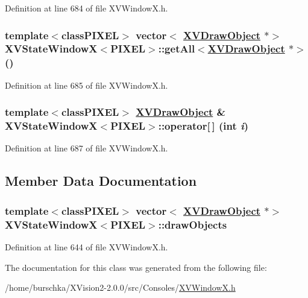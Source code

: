 Definition at line 684 of file XVWindow\-X.h.\label{XVStateWindowX_a14}
\hypertarget{class_XVStateWindowX_a14}{
\subsubsection[getAll]{\setlength{\rightskip}{0pt plus 5cm}template$<$classPIXEL$>$ vector$<$ \hyperlink{class_XVDrawObject}{XVDraw\-Object} $\ast$$>$ XVState\-Window\-X$<$PIXEL$>$::get\-All$<$\hyperlink{class_XVDrawObject}{XVDraw\-Object} $\ast$$>$ ()}}




Definition at line 685 of file XVWindow\-X.h.\label{XVStateWindowX_a15}
\hypertarget{class_XVStateWindowX_a15}{
\subsubsection[operator{}]{\setlength{\rightskip}{0pt plus 5cm}template$<$classPIXEL$>$ \hyperlink{class_XVDrawObject}{XVDraw\-Object} \& XVState\-Window\-X$<$PIXEL$>$::operator\mbox{[}$\,$\mbox{]} (int {\em i})}}




Definition at line 687 of file XVWindow\-X.h.

\subsection{Member Data Documentation}
\label{XVStateWindowX_n0}
\hypertarget{class_XVStateWindowX_n0}{
\subsubsection[drawObjects]{\setlength{\rightskip}{0pt plus 5cm}template$<$classPIXEL$>$ vector$<$ \hyperlink{class_XVDrawObject}{XVDraw\-Object} $\ast$$>$ XVState\-Window\-X$<$PIXEL$>$::draw\-Objects}}




Definition at line 644 of file XVWindow\-X.h.

The documentation for this class was generated from the following file:\begin{CompactItemize}
\item 
/home/burschka/XVision2-2.0.0/src/Consoles/\hyperlink{XVWindowX.h-source}{XVWindow\-X.h}\end{CompactItemize}
